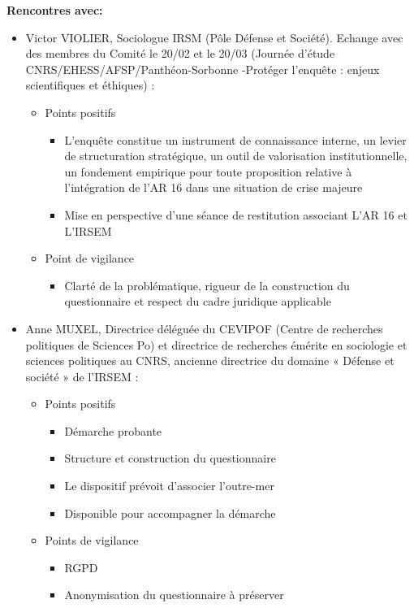 \documentclass[10pt,a4paper]{article}
\begin{document}
\textbf{Rencontres avec:}

\begin{itemize}
    \item Victor VIOLIER, Sociologue IRSM (Pôle Défense et Société). Echange avec des membres du Comité le 20/02 et le 20/03 (Journée d'étude CNRS/EHESS/AFSP/Panthéon-Sorbonne -Protéger l'enquête : enjeux scientifiques et éthiques) :
    \begin{itemize}
        \item Points positifs
        \begin{itemize}
            \item L'enquête constitue un instrument de connaissance interne, un levier de structuration stratégique, un outil de valorisation institutionnelle, un fondement empirique pour toute proposition relative à l'intégration de l'AR 16 dans une situation de crise majeure
            \item Mise en perspective d'une séance de restitution associant L'AR 16 et L'IRSEM
        \end{itemize}
        \item Point de vigilance
        \begin{itemize}
            \item Clarté de la problématique, rigueur de la construction du questionnaire et respect du cadre juridique applicable
        \end{itemize}
    \end{itemize}
    \item Anne MUXEL, Directrice déléguée du CEVIPOF (Centre de recherches politiques de Sciences Po) et directrice de recherches émérite en sociologie et sciences politiques au CNRS, ancienne directrice du domaine « Défense et société » de l'IRSEM :
    \begin{itemize}
        \item Points positifs
        \begin{itemize}
            \item Démarche probante
            \item Structure et construction du questionnaire
            \item Le dispositif prévoit d'associer l'outre-mer
            \item Disponible pour accompagner la démarche
        \end{itemize}
        \item Points de vigilance
        \begin{itemize}
            \item RGPD
            \item Anonymisation du questionnaire à préserver
        \end{itemize}
    \end{itemize}
\end{itemize}
\end{document}
